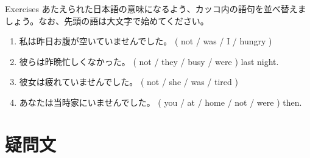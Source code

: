 \documentclass[aspectratio=169,xcolor={dvipsnames,table}]{beamer}
\newcommand{\myaudio}[1]{\href{#1}{\faVolumeUp}}
\begin{document}
\begin{frame}[plain]{Exercises}
あたえられた日本語の意味になるよう、カッコ内の語句を並べ替えましょう。なお、先頭の語は大文字で始めてください。 

\begin{enumerate}
 \item 私は昨日お腹が空いていませんでした。
( not / was / I / hungry )\\
 \item 
彼らは昨晩忙しくなかった。
( not / they / busy / were ) last night.\\
 \item 
彼女は疲れていませんでした。
( not / she / was / tired )\\
 \item 
あなたは当時家にいませんでした。
( you / at / home / not / were ) then.\\
\end{enumerate}

\hfill\myaudio{./audio/024_past_be_05.pdf}

\end{frame}


\section{疑問文}
\end{document}
